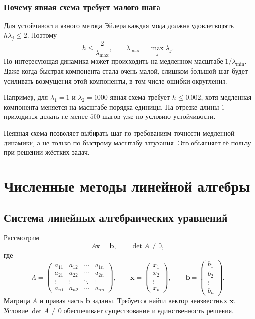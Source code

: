 \documentclass[../final.tex]{subfiles}
\begin{document}
\subsection{Почему явная схема требует малого шага}

Для устойчивости явного метода Эйлера каждая мода должна удовлетворять
$h\lambda_j\le2$. Поэтому
\begin{equation*}
    h\le\frac2{\lambda_{\max}},\qquad
    \lambda_{\max}=\max_j\lambda_j.
\end{equation*}
Но интересующая динамика может происходить на медленном масштабе
$1/\lambda_{\min}$. Даже когда быстрая компонента стала очень малой,
слишком большой шаг будет усиливать возмущения этой компоненты,
в том числе ошибки округления.

Например, для $\lambda_1=1$ и $\lambda_2=1000$ явная схема требует
$h\le0.002$, хотя медленная компонента меняется на масштабе порядка
единицы. На отрезке длины $1$ приходится делать не менее $500$ шагов
уже по условию устойчивости.

Неявная схема позволяет выбирать шаг по требованиям точности
медленной динамики, а не только по быстрому масштабу затухания.
Это объясняет её пользу при решении жёстких задач.

\chapter{Численные методы линейной алгебры}

\section{Система линейных алгебраических уравнений}

Рассмотрим 
\begin{equation*}
    A\boldsymbol x=\boldsymbol b,\qquad \det A\ne0,
\end{equation*}
где
\begin{equation*}
    A=\begin{pmatrix}
        a_{11}&a_{12}&\cdots&a_{1n}\\
        a_{21}&a_{22}&\cdots&a_{2n}\\
        \vdots&\vdots&\ddots&\vdots\\
        a_{n1}&a_{n2}&\cdots&a_{nn}
    \end{pmatrix},\qquad
    \boldsymbol x=\begin{pmatrix}x_1\\x_2\\\vdots\\x_n\end{pmatrix},\qquad
    \boldsymbol b=\begin{pmatrix}b_1\\b_2\\\vdots\\b_n\end{pmatrix}.
\end{equation*}
Матрица $A$ и правая часть $\boldsymbol b$ заданы. Требуется найти
вектор неизвестных $\boldsymbol x$. Условие $\det A\ne0$
обеспечивает существование и единственность решения.
\end{document}
